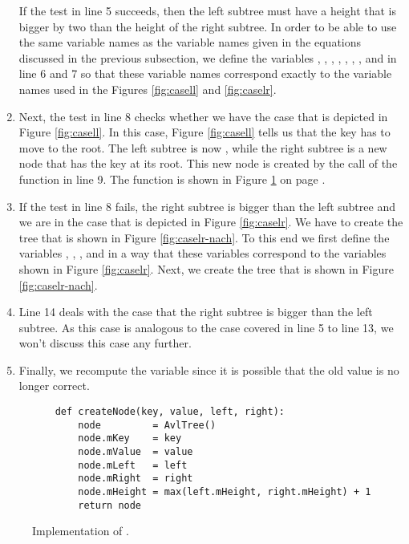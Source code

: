 \begin{enumerate}
      If the test in line 5 succeeds, then the left subtree must have a height that is bigger by
      two than the height of the right subtree.  In order to be able to use the same variable names 
      as the variable names given in the equations discussed in the previous subsection, we define
      the variables , , , , , , ,
      and  in line 6 and 7 so that these variable names correspond exactly to the variable names
      used in the Figures \ref{fig:casell} and \ref{fig:caselr}.
\item Next, the test in line 8 checks whether we have the case that is depicted in Figure
      \ref{fig:casell}.  In this case, Figure \ref{fig:casell} tells us that the key 
      has to move to the root.  The left subtree is now , while the right subtree is a
      new node that has the key  at its root.  This new node is created by the call
      of the function  in line 9.  The function  is shown in
      Figure \ref{fig:avl-tree.ipython:createNode} on page \pageref{fig:avl-tree.ipython:createNode}.
\item If the test in line 8 fails, the right subtree is bigger than the left subtree and we are in 
      the case that is depicted in Figure \ref{fig:caselr}.  We have to create the tree that is
      shown in Figure \ref{fig:caselr-nach}.  To this end we first define the variables 
      , , , and  in a way that these variables
      correspond to the variables shown in Figure \ref{fig:caselr}.  Next, we create the tree
      that is shown in Figure \ref{fig:caselr-nach}.
\item Line 14 deals with the case that the right subtree is bigger than the left subtree. 
      As this case is analogous to the case covered in line 5 to line 13, we won't discuss this case
      any further.
\item Finally, we recompute the variable  since it is possible that the old value is
      no longer correct.
\end{enumerate}


\begin{figure}[!ht]
\centering
\begin{verbatim}
    def createNode(key, value, left, right):
        node         = AvlTree()
        node.mKey    = key
        node.mValue  = value
        node.mLeft   = left
        node.mRight  = right
        node.mHeight = max(left.mHeight, right.mHeight) + 1
        return node
\end{verbatim}
\vspace*{-0.3cm}
\caption{Implementation of .}
\label{fig:avl-tree.ipython:createNode}
\end{figure}

